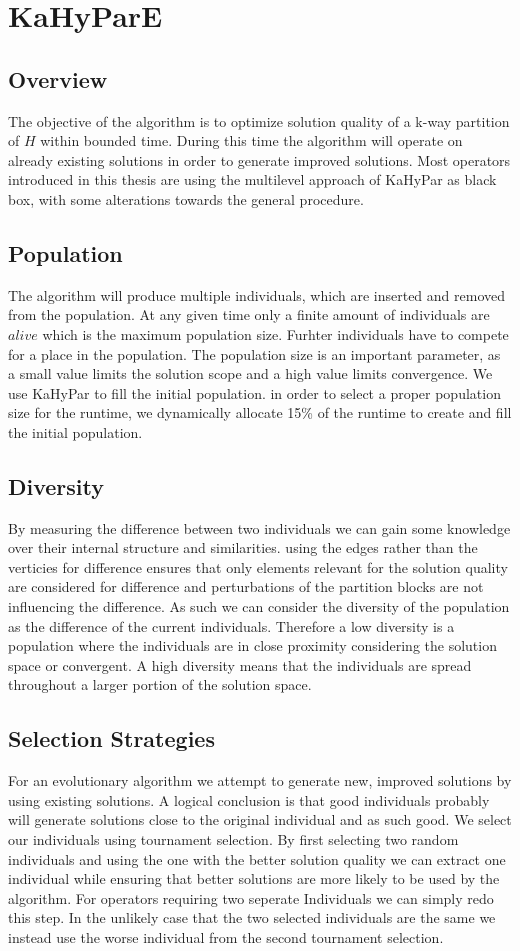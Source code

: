 \documentclass[a4paper,12pt,bibtotoc,titlepage, liststotoc,BCOR7mm,headsepline,pointlessnumbers]{scrbook}
\numberwithin{equation}{section}
\begin{document}
\chapter{KaHyParE}
\section{Overview}
The objective of the algorithm is to optimize solution quality of a k-way partition of $H$ within bounded time. During this time
the algorithm will operate on already existing solutions in order to generate improved solutions. Most operators introduced in this 
thesis are using the multilevel approach of KaHyPar as black box, with some alterations towards the general procedure.  
\section{Population}
The algorithm will produce multiple individuals, which are inserted and removed from the population. At any given time only a finite amount of
individuals are $alive$ which is the maximum population size. Furhter individuals have to compete for a place in the population. 
The population size is an important parameter, as a small value limits the solution scope and a high value limits convergence.
We use KaHyPar to fill the initial population.
in order to select a proper population size for the runtime, we dynamically allocate 15\% of the runtime to create and fill the initial population.
\section{Diversity}
By measuring the difference between two individuals we can gain some knowledge over their internal structure and similarities.
using the edges rather than the verticies for difference ensures that only elements relevant for the solution quality are considered
for difference and perturbations of the partition blocks are not influencing the difference. As such we can consider the diversity of
the population as the difference of the current individuals. Therefore a low diversity is a population where the individuals are 
in close proximity considering the solution space or convergent. A high diversity means that the individuals are spread throughout a 
larger portion of the solution space.  
\section{Selection Strategies}
For an evolutionary algorithm we attempt to generate new, improved solutions by using existing solutions. A logical conclusion is that good individuals probably will generate solutions
close to the original individual and as such good. We select our individuals using tournament selection. By first selecting two random individuals and using the one with the better solution quality we can extract one individual while ensuring that better solutions are more likely to be used by the algorithm. For operators requiring two seperate Individuals we can simply redo this step. In the unlikely case that the two selected individuals are the same we instead use the worse individual from the second tournament selection. 
\end{document}
